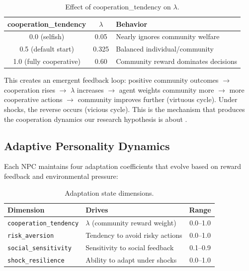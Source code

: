 \begin{table}[ht]
\centering
\caption{Effect of cooperation\_tendency on $\lambda$.}
\label{tab:lambda}
\begin{tabular}{@{}ccl@{}}
\toprule
cooperation\_tendency & $\lambda$ & Behavior \\
\midrule
0.0 (selfish) & 0.05 & Nearly ignores community welfare \\
0.5 (default start) & 0.325 & Balanced individual/community \\
1.0 (fully cooperative) & 0.60 & Community reward dominates decisions \\
\bottomrule
\end{tabular}
\end{table}

This creates an emergent feedback loop: positive community outcomes $\to$ cooperation rises $\to$ $\lambda$ increases $\to$ agent weights community more $\to$ more cooperative actions $\to$ community improves further (virtuous cycle). Under shocks, the reverse occurs (vicious cycle). This is the mechanism that produces the cooperation dynamics our research hypothesis is about \cite{leibo2017social}.

\subsection{Adaptive Personality Dynamics}

Each NPC maintains four adaptation coefficients that evolve based on reward feedback and environmental pressure:

\begin{table}[ht]
\centering
\caption{Adaptation state dimensions.}
\label{tab:adaptation}
\begin{tabular}{@{}llc@{}}
\toprule
Dimension & Drives & Range \\
\midrule
\texttt{cooperation\_tendency} & $\lambda$ (community reward weight) & 0.0--1.0 \\
\texttt{risk\_aversion} & Tendency to avoid risky actions & 0.0--1.0 \\
\texttt{social\_sensitivity} & Sensitivity to social feedback & 0.1--0.9 \\
\texttt{shock\_resilience} & Ability to adapt under shocks & 0.0--1.0 \\
\bottomrule
\end{tabular}
\end{table}

